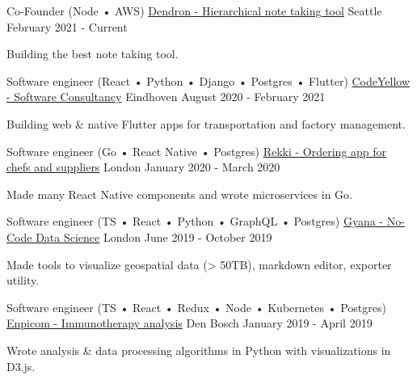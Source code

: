 

\begin{cventries}

  \cventry
    {Co-Founder (Node • AWS)}
    {\href{https://dendron.so}{Dendron - Hierarchical note taking tool}}
    {Seattle}
    {February 2021 - Current}
     {
      \begin{cvitems}
        \item {Building the best note taking tool.}
      \end{cvitems}
    }

  \cventry
    {Software engineer (React • Python • Django • Postgres • Flutter)}
    {\href{https://codeyellow.nl}{CodeYellow - Software Consultancy}}
    {Eindhoven}
    {August 2020 - February 2021}
     {
      \begin{cvitems}
        \item {Building web \& native Flutter apps for transportation and factory management.}
      \end{cvitems}
    }

  \cventry
    {Software engineer (Go • React Native • Postgres)}
    {\href{https://www.rekki.com}{Rekki - Ordering app for chefs and suppliers}}
    {London}
    {January 2020 - March 2020}
     {
      \begin{cvitems}
        \item {Made many React Native components and wrote microservices in Go.}
      \end{cvitems}
    }

  \cventry
    {Software engineer (TS • React • Python • GraphQL • Postgres)}
    {\href{https://www.gyana.com}{Gyana - No-Code Data Science}}
    {London}
    {June 2019 - October 2019}
     {
      \begin{cvitems}
        \item {Made tools to visualize geospatial data (> 50TB), markdown editor, exporter utility.}
      \end{cvitems}
    }

  \cventry
    {Software engineer (TS • React • Redux • Node • Kubernetes • Postgres)}
    {\href{https://www.enpicom.com}{Enpicom - Immunotherapy analysis}}
    {Den Bosch}
    {January 2019 - April 2019}
     {
      \begin{cvitems}
        \item {Wrote analysis \& data processing algorithms in Python with visualizations in D3.js.}
      \end{cvitems}
    }


\end{cventries}
